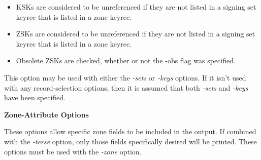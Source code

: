 \begin{description}
\begin{itemize}
\item KSKs are considered to be unreferenced if they are not listed in a
signing set keyrec that is listed in a zone keyrec.

\item ZSKs are considered to be unreferenced if they are not listed in a
signing set keyrec that is listed in a zone keyrec.

\item Obsolete ZSKs are checked, whether or not the -obs flag was specified.

\end{itemize}

This option may be used with either the {\it -sets} or {\it -keys} options.
If it isn't used with any record-selection options, then it is assumed that
both {\it -sets} and {\it -keys} have been specified.

\end{description}

{\bf Zone-Attribute Options}

These options allow specific zone fields to be included in the output.  If
combined with the {\it -terse} option, only those fields specifically desired
will be printed.  These options must be used with the {\it -zone} option.

